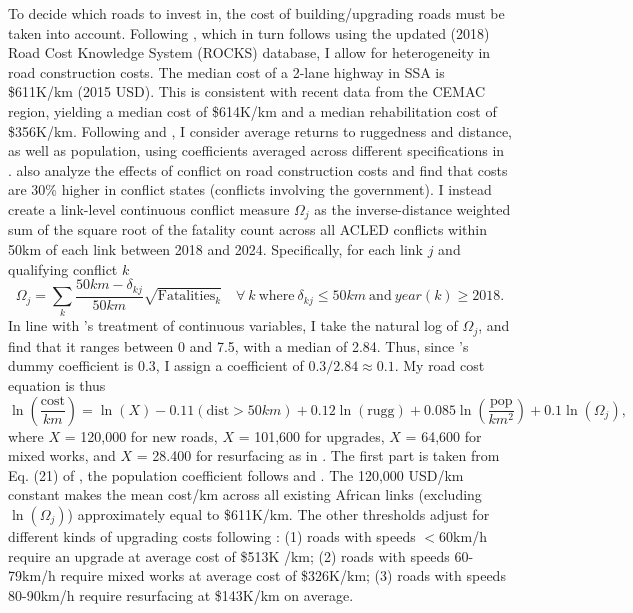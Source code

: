 \documentclass[a4paper]{article}
\begin{document}
To decide which roads to invest in, the cost of building/upgrading roads must be taken into account. Following \citet{krantz2024optimal}, which in turn follows \citet{collier2016cost} using the updated (2018) Road Cost Knowledge System (ROCKS) database, I allow for heterogeneity in road construction costs. The median cost of a 2-lane highway in SSA is \$611K/km (2015 USD). This is consistent with recent data from the CEMAC region, yielding a median cost of \$614K/km and a median rehabilitation cost of \$356K/km. Following \citet{fajgelbaum2020optimal} and \citet{graff2024spatial}, I consider average returns to ruggedness and distance, as well as population, using coefficients averaged across different specifications in \citet{collier2016cost}. \citet{collier2016cost} also analyze the effects of conflict on road construction costs and find that costs are 30\% higher in conflict states (conflicts involving the government). I instead create a link-level continuous conflict measure $\Omega_j$ as the inverse-distance weighted sum of the square root of the fatality count across all ACLED conflicts within 50km of each link between 2018 and 2024. Specifically, for each link $j$ and qualifying conflict $k$
\begin{equation} \label{eq:conf}
\Omega_j = \sum_{k} \frac{50km-\delta_{kj}}{50km} \sqrt{\text{Fatalities}_k}\quad \forall\ k\ \text{where}\ \delta_{kj}\leq 50km\ \text{and}\  year(k)\geq 2018.
\end{equation}
In line with \citet{collier2016cost}'s treatment of continuous variables, I take the natural log of $\Omega_j$, and find that it ranges between 0 and 7.5, with a median of 2.84. Thus, since \citet{collier2016cost}'s dummy coefficient is 0.3, I assign a coefficient of $0.3/2.84\approx 0.1$. My road cost equation is thus
\begin{equation} \label{eq:COST}
\ln\left(\frac{\text{cost}}{km}\right) = \ln(X) -0.11 (\text{dist} > 50km) + 0.12 \ln(\text{rugg}) + 0.085 \ln\left(\frac{\text{pop}}{km^2}\right)+ 0.1 \ln(\Omega_j),
\end{equation}
where $X$ = 120,000 for new roads, $X$ = 101,600 for upgrades, $X$ = 64,600 for mixed works, and $X$ = 28.400 for resurfacing as in \citet{krantz2024optimal}. The first part is taken from Eq. (21) of \citet{fajgelbaum2020optimal}, the population coefficient follows \citet{collier2016cost} and \citet{krantz2024optimal}. The 120,000 USD/km constant makes the mean cost/km across all existing African links (excluding $\ln(\Omega_j)$) approximately equal to \$611K/km. The other thresholds adjust for different kinds of upgrading costs following \citet{krantz2024optimal}: (1) roads with speeds $<$60km/h require an upgrade at average cost of \$513K /km; (2) roads with speeds 60-79km/h require mixed works at average cost of \$326K/km; (3) roads with speeds 80-90km/h require resurfacing at \$143K/km on average. 
\end{document}
